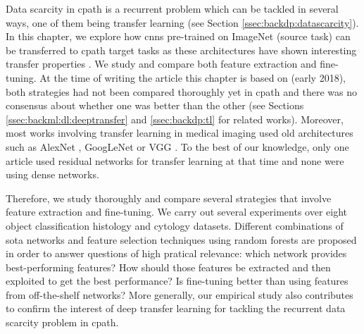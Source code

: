 
Data scarcity in \acrlong{cpath} is a recurrent problem which can be tackled in several ways, one of them being transfer learning (see Section \ref{ssec:backdp:datascarcity}). In this chapter, we explore how \acrlong{cnn}s pre-trained on ImageNet \cite{deng2009imagenet} (source task) can be transferred to \acrlong{cpath} target tasks as these architectures have shown interesting transfer properties \cite{donahue2014decaf,yosinski2014transferable,sermanet2013overfeat}. We study and compare both feature extraction and fine-tuning. At the time of writing the article this chapter is based on (early 2018), both strategies had not been compared thoroughly yet in \acrlong{cpath} and there was no consensus about whether one was better than the other (see Sections \ref{ssec:backml:dl:deeptransfer} and \ref{ssec:backdp:tl} for related works). Moreover, most works involving transfer learning in medical imaging used old architectures such as AlexNet \cite{shin2016deep,bayramoglu2016transfer,antony2016quantifying,ravishankar2016understanding,tajbakhsh2016convolutional,kumar2017comparative,kim2016deep}, GoogLeNet \cite{shin2016deep,bayramoglu2016transfer} or VGG \cite{kieffer2017convolutional,bayramoglu2016transfer,antony2016quantifying,yu2017deep,hou2016automatic,kumar2017comparative}. To the best of our knowledge, only one article used residual networks for transfer learning at that time \cite{yu2017deep} and none were using dense networks.

Therefore, we study thoroughly and compare several strategies that involve feature extraction and fine-tuning. We carry out several experiments over eight object classification histology and cytology datasets. Different combinations of \acrlong{sota} networks and feature selection techniques using random forests are proposed in order to answer questions of high pratical relevance: which network provides best-performing features? How should those features be extracted and then exploited to get the best performance? Is fine-tuning better than using features from off-the-shelf networks? More generally, our empirical study also contributes to confirm the interest of deep transfer learning for tackling the recurrent data scarcity problem in \acrlong{cpath}.

